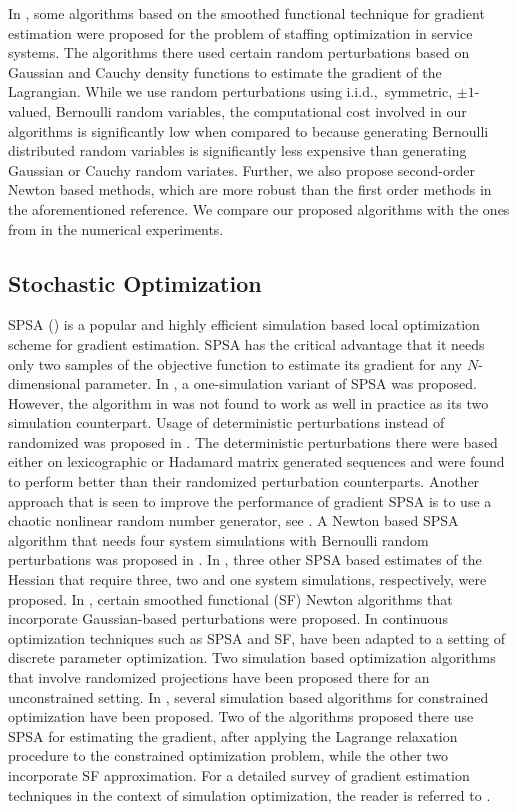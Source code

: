 \documentclass[11pt,letterpaper,english]{article}
\begin{document}
In \citep{prashanth2011ss}, some algorithms based on the smoothed functional technique
for gradient estimation were proposed for the
problem of staffing optimization in service systems. The algorithms 
there used certain random perturbations based on Gaussian and Cauchy density
functions to estimate the gradient of the Lagrangian. While we use random
perturbations using i.i.d.,~symmetric, $\pm 1$-valued, Bernoulli random variables, the computational
cost involved in our algorithms is significantly low when compared to \citep{prashanth2011ss}
because generating Bernoulli distributed random variables is significantly
less expensive than generating Gaussian or
Cauchy random variates. Further,
we also propose second-order Newton based methods, which are more robust than
the first order methods in the aforementioned reference. We compare our
proposed algorithms with the ones from \citep{prashanth2011ss} in the numerical
experiments.

\subsection{Stochastic Optimization}
SPSA (\citep{spall92multivariate}) is a popular and
highly efficient simulation based local optimization scheme for
gradient estimation. SPSA has the critical
advantage that it needs only two samples of the objective function to estimate its gradient for
any $N$-dimensional parameter. In \citep{spall1997one}, a
one-simulation variant of SPSA was proposed. However, the algorithm in
\citep{spall1997one} was not found to work as well in practice as its
two simulation counterpart.  Usage of deterministic perturbations
instead of randomized was proposed in \citep{bhatnagar2003two}. The
deterministic perturbations there were based either on lexicographic
or Hadamard matrix generated sequences and were found to perform better
than their randomized perturbation counterparts. Another approach that is seen to improve the
performance of gradient SPSA is to use a chaotic nonlinear random
number generator, see \citep{bhatnagar2003multiscale}. A Newton based SPSA algorithm that needs four system simulations with Bernoulli random perturbations was proposed in \citep{spall2000adaptive}. In \citep{bhatnagar2005adaptive}, three other SPSA based estimates of the Hessian that require three, two and one system simulations, respectively, were proposed. In \citep{bhatnagar2007adaptive}, certain smoothed functional (SF) Newton algorithms that incorporate Gaussian-based perturbations were proposed.
In \citep{shalabh2011stochastic} continuous optimization techniques such as SPSA and SF, have been adapted to a setting of discrete parameter optimization. Two simulation based optimization algorithms that involve randomized projections have been proposed there for an unconstrained setting.  
 In \citep{shalabh2011constrained}, several
simulation based algorithms for constrained optimization have been
proposed. Two of the algorithms proposed there use SPSA for estimating
the gradient, after applying the Lagrange relaxation procedure to the
constrained optimization problem, while the other two incorporate SF approximation.
For a detailed survey of gradient estimation techniques in the context of simulation optimization, the reader is referred to \citep{book}.
\end{document}
